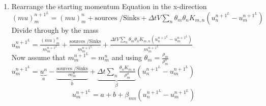\documentclass[fleqn]{article}
\newcommand{\rhoM}      {\ensuremath{\rho^{o}_m}}
\newcommand{\delt}      {\ensuremath{\Delta{t}} }
\begin{document}
\begin{enumerate}
\item Rearrange the starting momentum Equation in the x-direction \\
$  (mu)^{n+1^{L}}_m 
    = (m u)_m^{n}
    + \text{sources /Sinks}
    + \delt V \sum_n \theta_m \theta_n K_{m,n} (u_n^{n+1^{L}} - u_m^{n+1^{L}})
$\\
Divide through by the mass\\
$   u^{n+1^{L}}_m 
    = \frac{(m u)_m^{n} }{m^{n+1^{L}}_m}
    + \frac{\text{sources /Sinks} }{m^{n+1^{L}}_m}
    + \frac{\delt V \sum_n \theta_m \theta_n K_{m,n} (u_n^{n+1^{L}} - u_m^{n+1^{L}})}{m^{n+1^{L}}_m}
$\\ 
Now assume that $m^{n+1^{L}}_m = m^{n}_m$ and using $\theta_m = \frac{\rho_m}{\rhoM}$\\
$    u^{n+1^{L}}_m 
    = \underbrace{ u^{n}  }_a
    - \underbrace{\frac{\text{sources /Sinks} }{m^{n}_m}}_b
    + \underbrace{\delt\sum_n \frac{\theta_n K_{m,n}}{\rhoM} }_\beta  (u_n^{n+1^{L}} - u_m^{n+1^{L}})
$
\[
    u^{n+1^{L}}_m 
    = a
    + b
    + \beta_{mn}  (u_n^{n+1^{L}} - u_m^{n+1^{L}})
\]


\end{enumerate}
\end{document}
